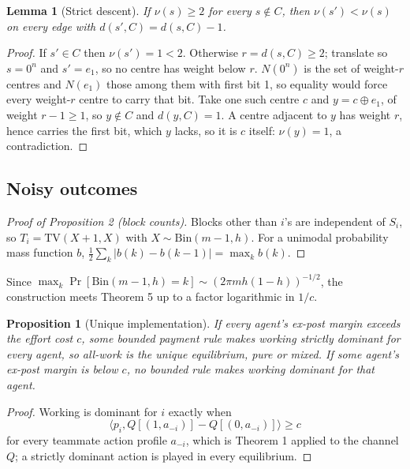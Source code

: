 \documentclass[sigconf,anonymous,acmthm=false]{acmart}
\theoremstyle{acmplain}
\newtheorem{slemma}{Lemma}
\newtheorem{sprop}{Proposition}
\theoremstyle{acmdefinition}
\newcommand{\TV}{\mathrm{TV}}
\begin{document}
\begin{slemma}[Strict descent]\label{lem:strict-descent}
If $\nu(s)\ge2$ for every $s\notin C$, then $\nu(s')<\nu(s)$ on every edge with
$d(s',C)=d(s,C)-1$.
\end{slemma}
\begin{proof}
If $s'\in C$ then $\nu(s')=1<2$. Otherwise $r=d(s,C)\ge2$; translate so $s=0^n$ and
$s'=e_1$, so no centre has weight below $r$. $N(0^n)$ is the set of weight-$r$ centres and
$N(e_1)$ those among them with first bit 1, so equality would force every weight-$r$ centre
to carry that bit. Take one such centre $c$ and $y=c\oplus e_1$, of weight $r-1\ge1$, so
$y\notin C$ and $d(y,C)=1$. A centre adjacent to $y$ has weight $r$, hence carries the first
bit, which $y$ lacks, so it is $c$ itself: $\nu(y)=1$, a contradiction.
\end{proof}

\subsection{Noisy outcomes}
\begin{proof}[Proof of Proposition 2 (block counts)]
Blocks other than $i$'s are independent of $S_i$, so $T_i=\TV(X+1,X)$ with
$X\sim\mathrm{Bin}(m-1,h)$. For a unimodal probability mass function $b$,
$\frac12\sum_k|b(k)-b(k-1)|=\max_kb(k)$.
\end{proof}
Since $\max_k\Pr[\mathrm{Bin}(m-1,h)=k]\sim(2\pi mh(1-h))^{-1/2}$, the construction meets
Theorem 5 up to a factor logarithmic in $1/c$.

\begin{sprop}[Unique implementation]\label{prop:unique}
If every agent's ex-post margin exceeds the effort cost $c$, some bounded payment rule makes
working strictly dominant for every agent, so all-work is the unique equilibrium, pure or
mixed. If some agent's ex-post margin is below $c$, no bounded rule makes working dominant
for that agent.
\end{sprop}
\begin{proof}
Working is dominant for $i$ exactly when
\[ \langle p_i,Q[(1,a_{-i})]-Q[(0,a_{-i})]\rangle\ge c \]
for every teammate action profile $a_{-i}$, which is Theorem 1 applied to the channel $Q$; a strictly dominant action is
played in every equilibrium.
\end{proof}
\end{document}
